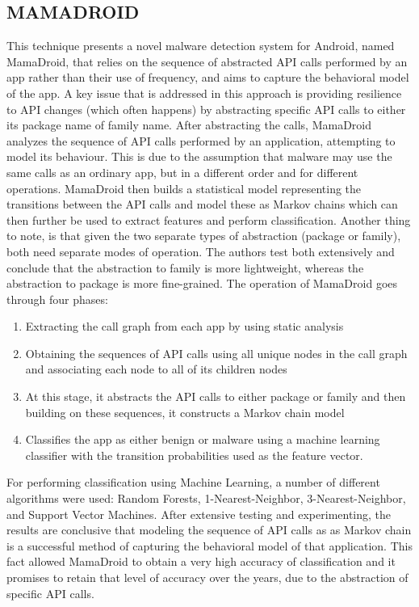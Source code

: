 \documentclass[11pt]{article}
\begin{document}
	\subsection{MAMADROID}
	This technique presents a novel malware detection system for Android, named MamaDroid, that relies on the sequence of abstracted API calls performed by an app rather than their use of frequency, and aims to capture the behavioral model of the app. A key issue that is addressed in this approach is providing resilience to API changes (which often happens) by abstracting specific API calls to either its package name of family name.
	After abstracting the calls, MamaDroid analyzes the sequence of API calls performed by an application, attempting to model its behaviour. This is due to the assumption that malware may use the same calls as an ordinary app, but in a different order and for different operations. MamaDroid then  builds a statistical model representing the transitions between the API calls and model these as Markov chains which can then further be used to extract features and perform classification. Another thing to note, is that given the two separate types of abstraction (package or family), both need separate modes of operation. The authors test both extensively and conclude that the abstraction to family is more lightweight, whereas the abstraction to package is more fine-grained.
	The operation of MamaDroid goes through four phases:
	\begin{enumerate}
		\item Extracting the call graph from each app by using static analysis
		\item Obtaining the sequences of API calls using all unique nodes in the call graph and associating each node to all of its children nodes
		\item At this stage, it abstracts the API calls to either package or family and then building on these sequences, it constructs a Markov chain model
		\item Classifies the app as either benign or malware using a machine learning classifier with the transition probabilities used as the feature vector. 
	\end{enumerate}
	For performing classification using Machine Learning, a number of different algorithms were used: Random Forests, 1-Nearest-Neighbor, 3-Nearest-Neighbor, and Support Vector Machines. After extensive testing and experimenting, the results are conclusive that modeling the sequence of API calls as as Markov chain is a successful method of capturing the behavioral model of that application. This fact allowed MamaDroid to obtain a very high accuracy of classification and it promises to retain that level of accuracy over the years, due to the abstraction of specific API calls.
	
\end{document}
